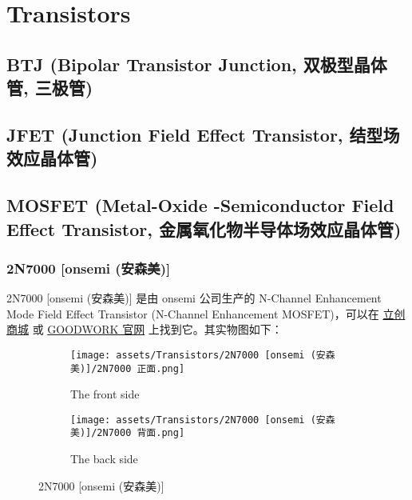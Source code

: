 \documentclass[UTF8]{report}
\begin{document}
\chapter{Transistors}\thispagestyle{fancy}
\section{BTJ (Bipolar Transistor Junction, 双极型晶体管, 三极管)}
\section{JFET (Junction Field Effect Transistor, 结型场效应晶体管)}
\section{MOSFET (Metal-Oxide -Semiconductor Field Effect Transistor, 金属氧化物半导体场效应晶体管)}


\subsection{2N7000 [onsemi (安森美)]}

2N7000 [onsemi (安森美)] 是由 onsemi 公司生产的 N-Channel Enhancement Mode Field Effect Transistor (N-Channel Enhancement MOSFET)，可以在 \href{https://item.szlcsc.com/232636.html}{立创商城} 或  \href{https://www.GOODWORK.com/products/discrete-power-modules/mosfets/small-signal-mosfets/1N4007}{GOODWORK 官网} 上找到它。其实物图如下：

\begin{figure}[H]\centering
    \begin{subfigure}[b]{0.5\columnwidth}\centering
        \texttt{[image: assets/Transistors/2N7000 [onsemi (安森美)]/2N7000 正面.png]}
        \caption{The front side}
    \end{subfigure}\hfill
    \begin{subfigure}[b]{0.5\columnwidth}\centering
        \texttt{[image: assets/Transistors/2N7000 [onsemi (安森美)]/2N7000 背面.png]}
        \caption{The back side}
    \end{subfigure}
    \caption{2N7000 [onsemi (安森美)]}
\end{figure}
\end{document}
